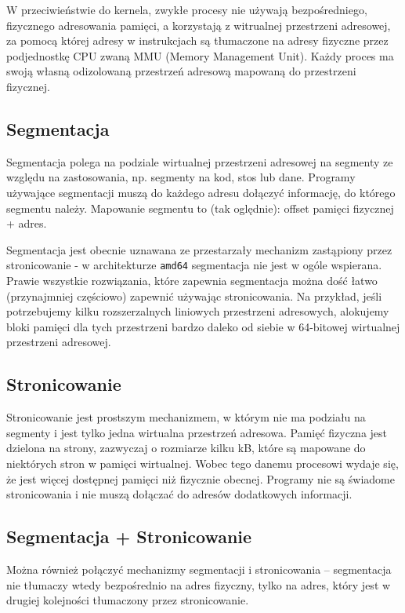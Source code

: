 W przeciwieństwie do kernela, zwykłe procesy nie używają bezpośredniego, fizycznego adresowania pamięci, a korzystają z witrualnej przestrzeni adresowej, za pomocą której adresy w instrukcjach są tłumaczone na adresy fizyczne przez podjednostkę CPU zwaną MMU (Memory Management Unit). Każdy proces ma swoją własną odizolowaną przestrzeń adresową mapowaną do przestrzeni fizycznej.

\subsection{Segmentacja}
Segmentacja polega na podziale wirtualnej przestrzeni adresowej na segmenty ze względu na zastosowania, np. segmenty na kod, stos lub dane. Programy używające segmentacji muszą do każdego adresu dołączyć informację, do którego segmentu należy. Mapowanie segmentu to (tak oględnie): offset pamięci fizycznej + adres.

Segmentacja jest obecnie uznawana ze przestarzały mechanizm zastąpiony przez stronicowanie - w architekturze \texttt{amd64} segmentacja nie jest w ogóle wspierana. Prawie wszystkie rozwiązania, które zapewnia segmentacja można dość łatwo (przynajmniej częściowo) zapewnić używając stronicowania. Na przykład, jeśli potrzebujemy kilku rozszerzalnych liniowych przestrzeni adresowych, alokujemy bloki pamięci dla tych przestrzeni bardzo daleko od siebie w 64-bitowej wirtualnej przestrzeni adresowej.

\subsection{Stronicowanie}
Stronicowanie jest prostszym mechanizmem, w którym nie ma podziału na segmenty i jest tylko jedna wirtualna przestrzeń adresowa. Pamięć fizyczna jest dzielona na strony, zazwyczaj o rozmiarze kilku kB, które są mapowane do niektórych stron w pamięci wirtualnej. Wobec tego danemu procesowi wydaje się, że jest więcej dostępnej pamięci niż fizycznie obecnej. Programy nie są świadome stronicowania i nie muszą dołączać do adresów dodatkowych informacji.

\subsection{Segmentacja + Stronicowanie}

Można również połączyć mechanizmy segmentacji i stronicowania -- segmentacja nie tłumaczy wtedy bezpośrednio na adres fizyczny, tylko na adres, który jest w drugiej kolejności tłumaczony przez stronicowanie.

